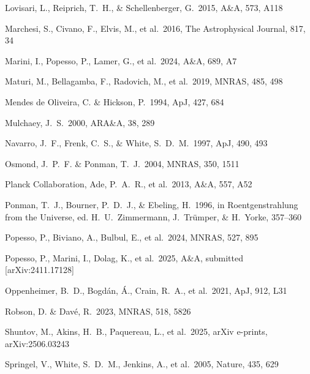 \documentclass{aa}
\begin{document}
\begin{thebibliography}{}
 Lovisari, L., Reiprich, T.~H., \& Schellenberger, G.\ 2015, A\&A, 573, A118

 Marchesi, S., Civano, F., Elvis, M., et al.\ 2016, The Astrophysical Journal, 817, 34

 Marini, I., Popesso, P., Lamer, G., et al.\ 2024, A\&A, 689, A7

 Maturi, M., Bellagamba, F., Radovich, M., et al.\ 2019, MNRAS, 485, 498

 Mendes de Oliveira, C. \& Hickson, P.\ 1994, ApJ, 427, 684

 Mulchaey, J.~S.\ 2000, ARA\&A, 38, 289

 Navarro, J.~F., Frenk, C.~S., \& White, S.~D.~M.\ 1997, ApJ, 490, 493

 Osmond, J.~P.~F. \& Ponman, T.~J.\ 2004, MNRAS, 350, 1511

 Planck Collaboration, Ade, P.~A.~R., et al.\ 2013, A\&A, 557, A52

 Ponman, T.~J., Bourner, P.~D.~J., \& Ebeling, H.\ 1996, in Roentgenstrahlung from the Universe, ed. H.~U.~Zimmermann, J.~Tr\"{u}mper, \& H.~Yorke, 357--360

 Popesso, P., Biviano, A., Bulbul, E., et al.\ 2024, MNRAS, 527, 895

 Popesso, P., Marini, I., Dolag, K., et al.\ 2025, A\&A, submitted [arXiv:2411.17128]

 Oppenheimer, B.~D., Bogd\'an, \'A., Crain, R.~A., et al.\ 2021, ApJ, 912, L31

 Robson, D. \& Dav\'e, R.\ 2023, MNRAS, 518, 5826

 Shuntov, M., Akins, H.~B., Paquereau, L., et al.\ 2025, arXiv e-prints, arXiv:2506.03243

 Springel, V., White, S.~D.~M., Jenkins, A., et al.\ 2005, Nature, 435, 629


\end{thebibliography}
\end{document}

